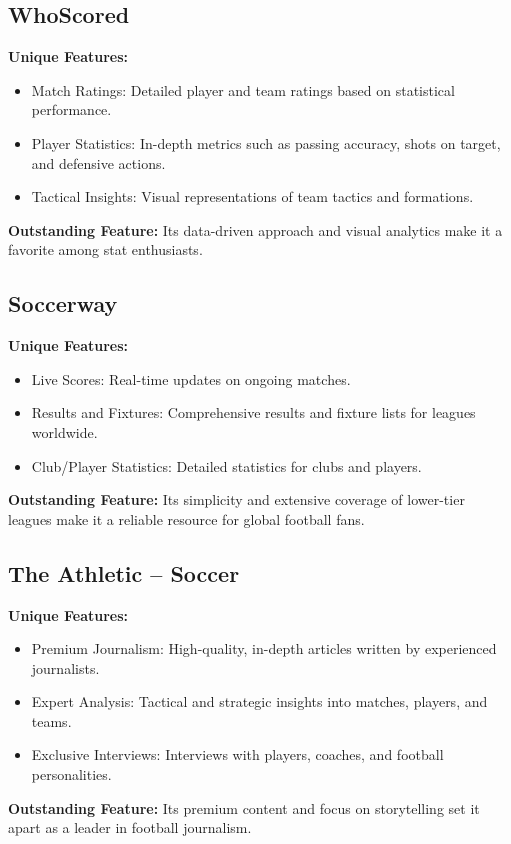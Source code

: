 \subsection{WhoScored}
\textbf{Unique Features:}
\begin{itemize}
    \item Match Ratings: Detailed player and team ratings based on statistical performance.
    \item Player Statistics: In-depth metrics such as passing accuracy, shots on target, and defensive actions.
    \item Tactical Insights: Visual representations of team tactics and formations.
\end{itemize}
\textbf{Outstanding Feature:} Its data-driven approach and visual analytics make it a favorite among stat enthusiasts.

\subsection{Soccerway}
\textbf{Unique Features:}
\begin{itemize}
    \item Live Scores: Real-time updates on ongoing matches.
    \item Results and Fixtures: Comprehensive results and fixture lists for leagues worldwide.
    \item Club/Player Statistics: Detailed statistics for clubs and players.
\end{itemize}
\textbf{Outstanding Feature:} Its simplicity and extensive coverage of lower-tier leagues make it a reliable resource for global football fans.

\subsection{The Athletic – Soccer}
\textbf{Unique Features:}
\begin{itemize}
    \item Premium Journalism: High-quality, in-depth articles written by experienced journalists.
    \item Expert Analysis: Tactical and strategic insights into matches, players, and teams.
    \item Exclusive Interviews: Interviews with players, coaches, and football personalities.
\end{itemize}
\textbf{Outstanding Feature:} Its premium content and focus on storytelling set it apart as a leader in football journalism.

